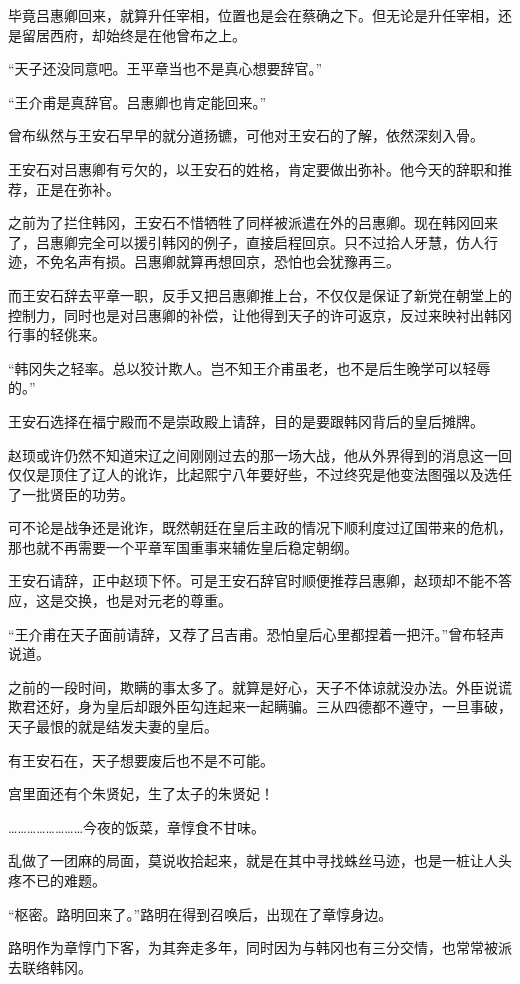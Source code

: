 毕竟吕惠卿回来，就算升任宰相，位置也是会在蔡确之下。但无论是升任宰相，还是留居西府，却始终是在他曾布之上。

“天子还没同意吧。王平章当也不是真心想要辞官。”

“王介甫是真辞官。吕惠卿也肯定能回来。”

曾布纵然与王安石早早的就分道扬镳，可他对王安石的了解，依然深刻入骨。

王安石对吕惠卿有亏欠的，以王安石的姓格，肯定要做出弥补。他今天的辞职和推荐，正是在弥补。

之前为了拦住韩冈，王安石不惜牺牲了同样被派遣在外的吕惠卿。现在韩冈回来了，吕惠卿完全可以援引韩冈的例子，直接启程回京。只不过拾人牙慧，仿人行迹，不免名声有损。吕惠卿就算再想回京，恐怕也会犹豫再三。

而王安石辞去平章一职，反手又把吕惠卿推上台，不仅仅是保证了新党在朝堂上的控制力，同时也是对吕惠卿的补偿，让他得到天子的许可返京，反过来映衬出韩冈行事的轻佻来。

“韩冈失之轻率。总以狡计欺人。岂不知王介甫虽老，也不是后生晚学可以轻辱的。”

王安石选择在福宁殿而不是崇政殿上请辞，目的是要跟韩冈背后的皇后摊牌。

赵顼或许仍然不知道宋辽之间刚刚过去的那一场大战，他从外界得到的消息这一回仅仅是顶住了辽人的讹诈，比起熙宁八年要好些，不过终究是他变法图强以及选任了一批贤臣的功劳。

可不论是战争还是讹诈，既然朝廷在皇后主政的情况下顺利度过辽国带来的危机，那也就不再需要一个平章军国重事来辅佐皇后稳定朝纲。

王安石请辞，正中赵顼下怀。可是王安石辞官时顺便推荐吕惠卿，赵顼却不能不答应，这是交换，也是对元老的尊重。

“王介甫在天子面前请辞，又荐了吕吉甫。恐怕皇后心里都捏着一把汗。”曾布轻声说道。

之前的一段时间，欺瞒的事太多了。就算是好心，天子不体谅就没办法。外臣说谎欺君还好，身为皇后却跟外臣勾连起来一起瞒骗。三从四德都不遵守，一旦事破，天子最恨的就是结发夫妻的皇后。

有王安石在，天子想要废后也不是不可能。

宫里面还有个朱贤妃，生了太子的朱贤妃！

……………………今夜的饭菜，章惇食不甘味。

乱做了一团麻的局面，莫说收拾起来，就是在其中寻找蛛丝马迹，也是一桩让人头疼不已的难题。

“枢密。路明回来了。”路明在得到召唤后，出现在了章惇身边。

路明作为章惇门下客，为其奔走多年，同时因为与韩冈也有三分交情，也常常被派去联络韩冈。

